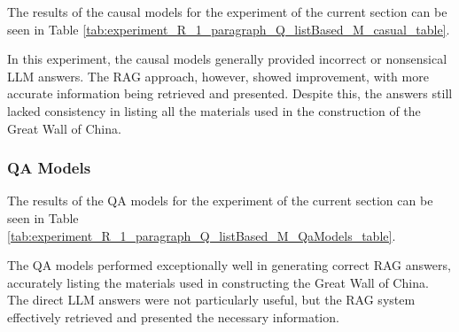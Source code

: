 \documentclass{wseas}
\begin{document}
The results of the causal models for the experiment of the current section can be seen 
in Table \ref{tab:experiment_R_1_paragraph_Q_listBased_M_casual_table}.

In this experiment, the causal models generally provided incorrect or
nonsensical LLM answers. The RAG approach, however, showed improvement,
with more accurate information being retrieved and presented. Despite
this, the answers still lacked consistency in listing all the materials
used in the construction of the Great Wall of China.

\subsubsection{QA Models}


The results of the QA models for the experiment of the current section
can be seen in Table \ref{tab:experiment_R_1_paragraph_Q_listBased_M_QaModels_table}.

The QA models performed exceptionally well in generating correct RAG
answers, accurately listing the materials used in constructing the Great
Wall of China. The direct LLM answers were not particularly useful, but
the RAG system effectively retrieved and presented the necessary
information.
\end{document}
